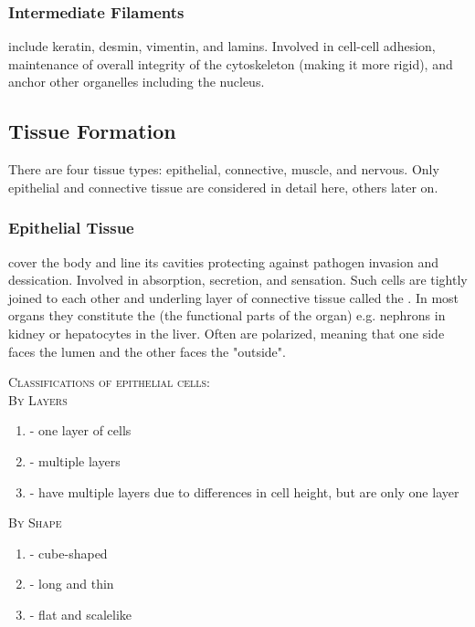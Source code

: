 \documentclass[../Bio_chemistryReview.tex]{subfiles}
\begin{document}
\subsubsection{Intermediate Filaments\supdag}

 include keratin, desmin, vimentin, and lamins.
Involved in cell-cell adhesion, maintenance of overall integrity of the
cytoskeleton (making it more rigid), and anchor other organelles including the
nucleus.

\subsection{Tissue Formation\supdag}

There are four tissue types: epithelial, connective, muscle, and nervous. Only
epithelial and connective tissue are considered in detail here, others later on.

\subsubsection{Epithelial Tissue\supdag}

 cover the body and line its cavities protecting
against pathogen invasion and dessication. Involved in absorption, secretion,
and sensation. Such cells are tightly joined to each other and underling layer
of connective tissue called the . In most organs they
constitute the  (the functional parts of the organ) e.g.
nephrons in kidney or hepatocytes in the liver. Often are polarized, meaning
that one side faces the lumen and the other faces the "outside". 

\begin{infobox}

  \textsc{Classifications of epithelial cells:}\\ \textsc{By Layers}
\begin{enumerate} \item {} - one layer
    of cells \item {} - multiple
    layers \item {} - have
      multiple layers due to differences in cell height, but are only one layer
\end{enumerate} \textsc{By Shape} \begin{enumerate} \item {} - cube-shaped \item {} -
      long and thin \item {} - flat and
        scalelike \end{enumerate} \end{infobox}
\end{document}
